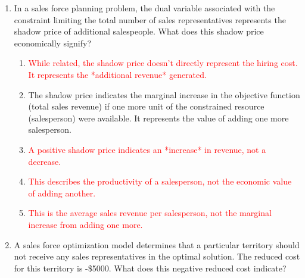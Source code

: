 \documentclass{article}%
\newcommand{\incorrect}[1]{\textcolor{red}{#1}}
\begin{document}
\begin{enumerate}
\vspace{1em}%
\item In a sales force planning problem, the dual variable associated with the constraint limiting the total number of sales representatives represents the shadow price of additional salespeople.  What does this shadow price economically signify?%
\begin{enumerate}%
\item \incorrect{While related, the shadow price doesn't directly represent the hiring cost. It represents the *additional revenue* generated.}%
\item The shadow price indicates the marginal increase in the objective function (total sales revenue) if one more unit of the constrained resource (salesperson) were available.  It represents the value of adding one more salesperson.%
\item \incorrect{A positive shadow price indicates an *increase* in revenue, not a decrease.}%
\item \incorrect{This describes the productivity of a salesperson, not the economic value of adding another.}%
\item \incorrect{This is the average sales revenue per salesperson, not the marginal increase from adding one more.}%
\end{enumerate}%
\vspace{1em}%
\item A sales force optimization model determines that a particular territory should not receive any sales representatives in the optimal solution. The reduced cost for this territory is -\$5000. What does this negative reduced cost indicate?%
%
\vspace{1em}%
\end{enumerate}

%
\end{document}
